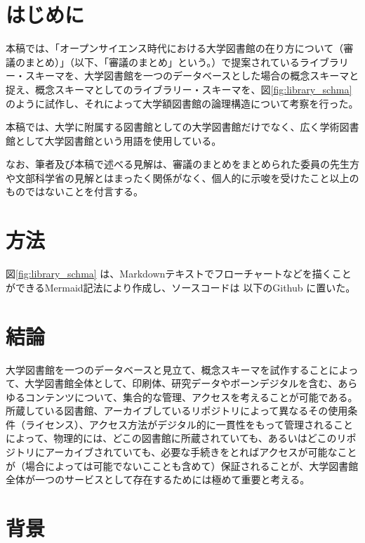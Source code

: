 \documentclass[submit,noauthor]{ono}
\begin{document}
	\maketitle
	
\section{はじめに}
	
本稿では、「オープンサイエンス時代における大学図書館の在り方について（審議のまとめ）」\cite{まとめ}（以下、「審議のまとめ」という。）で提案されているライブラリー・スキーマを、大学図書館を一つのデータベースとした場合の概念スキーマと捉え、概念スキーマとしてのライブラリー・スキーマを、図\ref{fig:library_schma} のように試作し、それによって大学額図書館の論理構造について考察を行った。

本稿では、大学に附属する図書館としての大学図書館だけでなく、広く学術図書館として大学図書館という用語を使用している。

なお、筆者及び本稿で述べる見解は、審議のまとめをまとめられた委員の先生方や文部科学省の見解とはまったく関係がなく、個人的に示唆を受けたこと以上のものではないことを付言する。

\section{方法}
図\ref{fig:library_schma} は、Markdownテキストでフローチャートなどを描くことができるMermaid記法により作成し、ソースコードは	以下のGithub 
に置いた。
	
\section{結論}
大学図書館を一つのデータベースと見立て、概念スキーマを試作することによって、大学図書館全体として、印刷体、研究データやボーンデジタルを含む、あらゆるコンテンツについて、集合的な管理、アクセスを考えることが可能である。所蔵している図書館、アーカイブしているリポジトリによって異なるその使用条件（ライセンス）、アクセス方法がデジタル的に一貫性をもって管理されることによって、物理的には、どこの図書館に所蔵されていても、あるいはどこのリポジトリにアーカイブされていても、必要な手続きをとればアクセスが可能なことが（場合によっては可能でないこことも含めて）保証されることが、大学図書館全体が一つのサービスとして存在するためには極めて重要と考える。
	
\section{背景}
\end{document}

